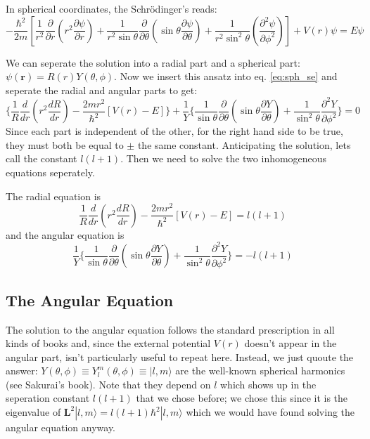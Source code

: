 \documentclass[prb,aps,11pt,superscriptaddress,floatfix]{revtex4-2}
\begin{document}
In spherical coordinates, the Schr\"odinger's reads:
\begin{equation}
  -\frac{\hbar^2}{2m} \left[  \frac{1}{r^2} \frac{\partial}{\partial r}  \left( r^2 \frac{\partial \psi }{\partial r} \right) 
 + \frac{1}{r^2 \sin\theta} \frac{ \partial}{ \partial \theta} \left( \sin \theta \frac{ \partial \psi }{ \partial \theta} \right) 
  +  \frac{1}{r^2 \sin^2\theta} \left( \frac{\partial^2 \psi}{\partial \phi^2} \right) \right]+V(r)\psi=E\psi
  \label{eq:sph_se}
\end{equation}

We can seperate the solution into a radial part and a spherical part: $\psi(\pmb{r})=R(r)Y(\theta,\phi)$. Now we insert this ansatz into eq. \ref{eq:sph_se} and seperate the radial and angular parts to get:
\begin{equation}
  \Big\{ \frac{1}{R} \frac{d}{dr} \left( r^2 \frac{dR}{dr} \right) - \frac{2mr^2}{\hbar^2} \left[V(r)-E \right] \Big\} + \frac{1}{Y} \Big\{ \frac{1}{\sin \theta} \frac{\partial}{\partial \theta} \left( \sin \theta \frac{\partial Y}{\partial \theta} \right) + \frac{1}{\sin^2 \theta}\frac{\partial^2 Y}{\partial \phi^2} \Big\}=0
\end{equation}
Since each part is independent of the other, for the right hand side to be true, they must both be equal to $\pm$ the same constant. Anticipating the solution, lets call the constant $l(l+1)$. Then we need to solve the two inhomogeneous equations seperately.


The radial equation is
\begin{equation}
  \frac{1}{R} \frac{d}{dr} \left( r^2 \frac{dR}{dr} \right) - \frac{2mr^2}{\hbar^2} \left[V(r)-E \right] = l(l+1)
  \label{eq:radial}
\end{equation}
and the angular equation is
\begin{equation}
  \frac{1}{Y} \Big\{ \frac{1}{\sin \theta} \frac{\partial}{\partial \theta} \left( \sin \theta \frac{\partial Y}{\partial \theta} \right) + \frac{1}{\sin^2 \theta}\frac{\partial^2 Y}{\partial \phi^2} \Big\}=-l(l+1)
  \label{eq:angular}
\end{equation}

\subsection{The Angular Equation}

The solution to the angular equation follows the standard prescription in all kinds of books and, since the external potential $V(r)$ doesn't appear in the angular part, isn't particularly useful to repeat here. Instead, we just quoute the answer: $Y(\theta,\phi)\equiv Y_l^m(\theta,\phi)\equiv|l,m\rangle$ are the well-known spherical harmonics (see Sakurai's book). Note that they depend on $l$ which shows up in the seperation constant $l(l+1)$ that we chose before; we chose this since it is the eigenvalue of $\pmb{L}^2|l,m\rangle = l(l+1)\hbar^2|l,m\rangle$ which we would have found solving the angular equation anyway. 
\end{document}

